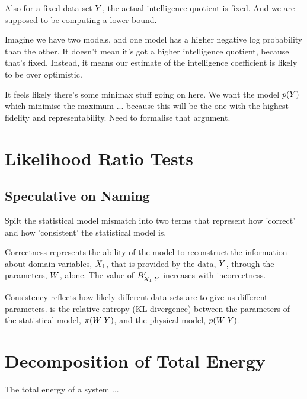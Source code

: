 \documentclass[]{article}
\begin{document}
Also for a fixed data set $Y$, the actual intelligence quotient is fixed. And we are supposed to be computing a lower bound. 

Imagine we have two models, and one model has a higher negative log probability than the other. It doesn't mean it's got a higher intelligence quotient, because that's fixed. Instead, it means our estimate of the intelligence coefficient is likely to be over optimistic. 

It feels likely there's some minimax stuff going on here. We want the model $p(Y)$ which minimise the maximum ... because this will be the one with the highest fidelity and representability. Need to formalise that argument.

\section{Likelihood Ratio Tests}


\subsection{Speculative on Naming}

Spilt the statistical model mismatch into two terms that represent how
'correct' and how 'consistent' the statistical model is.

Correctness represents the ability of the model to reconstruct the
information about domain variables, \({X_1}\), that is
provided by the data, \(Y\), through the parameters,
\(W\), alone. The value of
\(B^\prime_{{X_1}|Y}\) increases with
incorrectness.

Consistency reflects how likely different data sets are to give us
different parameters. is the relative entropy (KL divergence) between
the parameters of the statistical model,
\(\pi(W|Y)\), and the physical model,
\(p(W|Y)\).



\appendix

\section{Decomposition of Total Energy} \label{sec-decomposition-of-total-energy}

The total energy of a system ...
\end{document}
